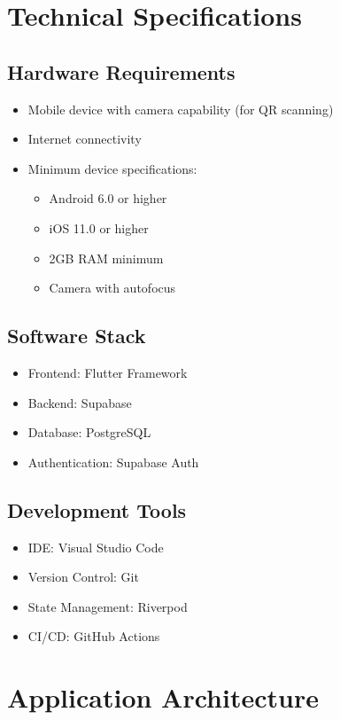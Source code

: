 \section{Technical Specifications}
\label{sec:tech_specs}
\subsection{Hardware Requirements}
\begin{itemize}
    \item Mobile device with camera capability (for QR scanning)
    \item Internet connectivity
    \item Minimum device specifications:
    \begin{itemize}
        \item Android 6.0 or higher
        \item iOS 11.0 or higher
        \item 2GB RAM minimum
        \item Camera with autofocus
    \end{itemize}
\end{itemize}

\subsection{Software Stack}
\begin{itemize}
    \item Frontend: Flutter Framework
    \item Backend: Supabase
    \item Database: PostgreSQL
    \item Authentication: Supabase Auth
\end{itemize}

\subsection{Development Tools}
\begin{itemize}
    \item IDE: Visual Studio Code
    \item Version Control: Git
    \item State Management: Riverpod
    \item CI/CD: GitHub Actions
\end{itemize}

\section{Application Architecture}
\label{sec:architecture}
